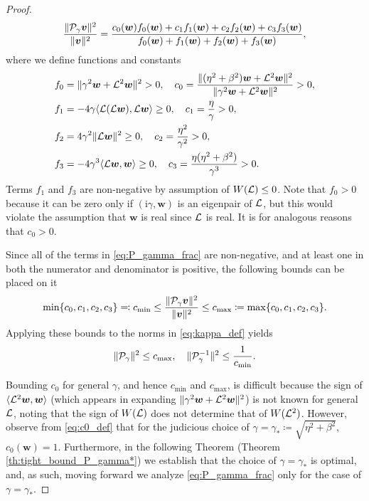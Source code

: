 \documentclass[a4paper,10pt]{article}
\begin{document}
\begin{proof}
\begin{align}
\frac{\Vert {\cal P}_{\gamma} \bm{v} \Vert^2}{\Vert \bm{v} \Vert^2}
=
\frac{
c_0(\bm{w}) f_0(\bm{w}) + c_1 f_1(\bm{w}) + c_2 f_2(\bm{w}) + c_3 f_3(\bm{w})
}
{
f_0(\bm{w}) + f_1(\bm{w}) + f_2(\bm{w}) + f_3(\bm{w})
},
\end{align}
where we define functions and constants
\begin{align}
\label{eq:c0_def}
f_0 &= \Vert \gamma^2 \bm{w} + {\cal L}^2 \bm{w} \Vert^2 > 0,
\quad
c_0 = \frac{\Vert (\eta^2 + \beta^2) \bm{w} + {\cal L}^2 \bm{w} \Vert^2}{\Vert \gamma^2 \bm{w} + {\cal L}^2 \bm{w} \Vert^2} > 0,
\\
\nonumber
f_1 &= -4 \gamma \langle {\cal L}({\cal L} \bm{w}), {\cal L} \bm{w} \rangle \geq 0,
\quad 
c_1 = \frac{\eta}{\gamma} > 0,\\
\nonumber
f_2 &= 4 \gamma^2 \Vert {\cal L} \bm{w} \Vert^2 \geq 0, 
\quad
c_2 = \frac{\eta^2}{\gamma^2} > 0, \\
\nonumber
f_3 &= -4 \gamma^3 \langle {\cal L} \bm{w}, \bm{w} \rangle \geq 0, 
\quad
c_3 = \frac{\eta (\eta^2 + \beta^2)}{\gamma^3} > 0.
\end{align}
Terms $f_1$ and $f_3$ are non-negative by assumption of $W({\cal L}) \leq 0$.
%
Note that $f_0 > 0$ because it can be zero only if $(\mathrm{i} \gamma, \bm{w})$ is an eigenpair of ${\cal L}$, but this would violate the assumption that $\bm{w}$ is real since ${\cal L}$ is real. It is for analogous reasons that $c_0 > 0$. 

Since all of the terms in \eqref{eq:P_gamma_frac} are non-negative, and at least one in both the numerator and denominator is positive, the following bounds can be placed on it
\begin{align*}
\min \{ c_0, c_1, c_2, c_3 \} \eqqcolon c_{\min}
\leq
\frac{\Vert {\cal P}_{\gamma} \bm{v} \Vert^2}{\Vert \bm{v} \Vert^2} 
\leq c_{\max} 
\coloneqq \max \{ c_0, c_1, c_2, c_3 \}.
\end{align*}
Applying these bounds to the norms in \eqref{eq:kappa_def} yields
\begin{align} \label{eq:P_gamma_bounds}
\Vert {\cal P}_{\gamma} \Vert^2 \leq c_{\max}, 
\quad
\Vert {\cal P}_{\gamma}^{-1} \Vert^2 \leq \frac{1}{c_{\min}}.
\end{align}

Bounding $c_0$ for general $\gamma$, and hence $c_{\min}$ and $c_{\max}$, is difficult because the sign of $\langle {\cal L}^2 \bm{w}, \bm{w} \rangle$ (which appears in expanding $\Vert \gamma^2 \bm{w} + {\cal L}^2 \bm{w} \Vert^2$) is not known for general ${\cal L}$, noting that the sign of $W({\cal L})$ does not determine that of $W({\cal L}^2)$. However, observe from \eqref{eq:c0_def} that for the judicious choice of $\gamma = \gamma_* \coloneqq \sqrt{\eta^2 + \beta^2}$, $c_0(\bm{w}) = 1$. Furthermore, in the following Theorem (Theorem \ref{th:tight_bound_P_gamma*}) we establish that the choice of $\gamma = \gamma_*$ is optimal, and, as such, moving forward we analyze \eqref{eq:P_gamma_frac} only for the case of $\gamma = \gamma_*$.


\end{proof}
\end{document}
